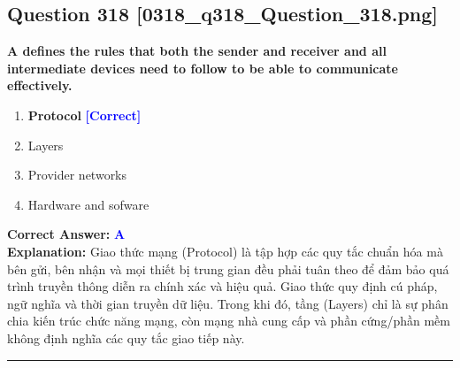 \documentclass[11pt,a4paper]{article}
\begin{document}
\begin{minipage}{\textwidth}
\subsection*{Question 318 \quad \footnotesize{[0318\_q318\_Question\_318.png]}}
\noindent \textbf{A defines the rules that both the sender and receiver and all intermediate devices need to follow to be able to communicate effectively.}

\begin{enumerate}[label=\Alph*.]
    \item \textbf{Protocol} \hfill \textcolor{blue}{\textbf{[Correct]}}
    \item Layers
    \item Provider networks
    \item Hardware and sofware
\end{enumerate}

\noindent \textbf{Correct Answer:} \textcolor{blue}{\textbf{A}} \\[2pt]
\noindent \textbf{Explanation:} Giao thức mạng (Protocol) là tập hợp các quy tắc chuẩn hóa mà bên gửi, bên nhận và mọi thiết bị trung gian đều phải tuân theo để đảm bảo quá trình truyền thông diễn ra chính xác và hiệu quả. Giao thức quy định cú pháp, ngữ nghĩa và thời gian truyền dữ liệu. Trong khi đó, tầng (Layers) chỉ là sự phân chia kiến trúc chức năng mạng, còn mạng nhà cung cấp và phần cứng/phần mềm không định nghĩa các quy tắc giao tiếp này.

\par\vspace{0.3cm}
\hrule
\vspace{0.3cm}
\end{minipage}
\end{document}
